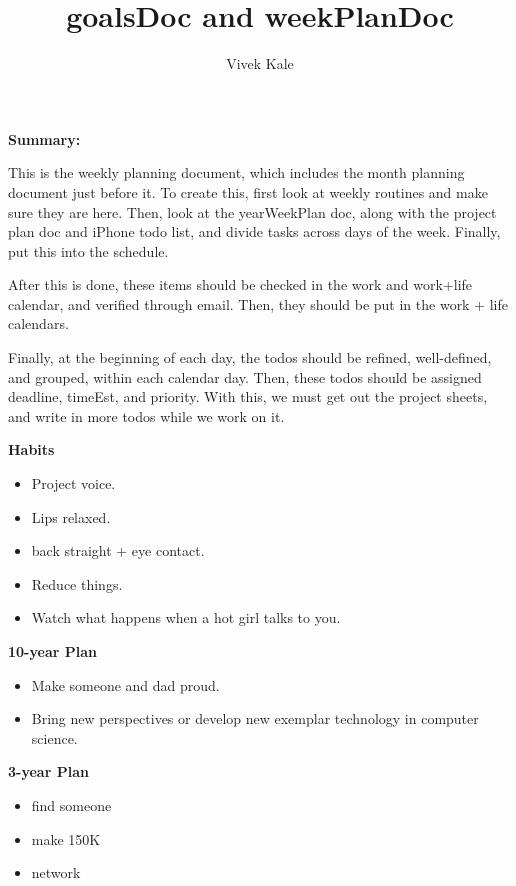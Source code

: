 \documentclass[11pt]{article}
\title{goalsDoc and weekPlanDoc}
\author{Vivek Kale}
\begin{document}
\maketitle 

\textbf{Summary:} {\small This is the weekly planning document, which includes 
the month planning document just before it. To create this, first look
at weekly routines and make sure they are 
here. Then, look at the yearWeekPlan doc, along with the project plan
doc and iPhone todo list, and divide tasks across days of the
week. Finally, put this into the schedule. 

After this is done, these items should be checked in the work and
work+life calendar, and verified through email. 
Then, they should be put in the work + life
calendars.

Finally, at the beginning of each day, the todos should be refined,
well-defined, and grouped, within each calendar day. Then, these todos
should be assigned deadline, timeEst, and priority. 
With this, we must get out the project sheets, and write in more todos
while we work on it. 
}

\newpage 

\textbf{Habits}
\begin{itemize}
  \tiny \item \tiny Project voice. 
\item \tiny Lips relaxed.
  \tiny \item \tiny back straight + eye contact.
\item \tiny Reduce things.
\item \tiny Watch what happens when a hot girl talks to you.
\end{itemize} 

\newpage
\textbf{10-year Plan}
\begin{itemize}
\small \item \small Make someone and dad proud. 
\item \small Bring new perspectives or develop new exemplar technology
  in computer science. 
\end{itemize}

\textbf{3-year Plan} 
\begin{itemize} 
  \small \item \small find someone
\item \small make 150K
\item \small network
\end{itemize} 
\end{document}

